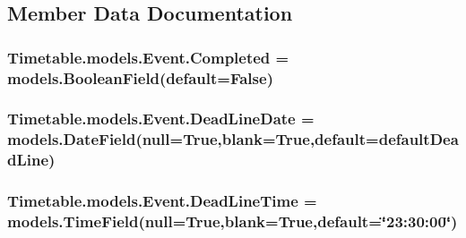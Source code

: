 \subsection{Member Data Documentation}
\subsubsection[{\texorpdfstring{Completed}{Completed}}]{\setlength{\rightskip}{0pt plus 5cm}Timetable.\+models.\+Event.\+Completed = models.\+Boolean\+Field(default=False)\hspace{0.3cm}{\ttfamily [static]}}\hypertarget{classTimetable_1_1models_1_1Event_a72b12a2e2015a620af6cfcf51a9231de}{}\label{classTimetable_1_1models_1_1Event_a72b12a2e2015a620af6cfcf51a9231de}
\subsubsection[{\texorpdfstring{Dead\+Line\+Date}{DeadLineDate}}]{\setlength{\rightskip}{0pt plus 5cm}Timetable.\+models.\+Event.\+Dead\+Line\+Date = models.\+Date\+Field(null=True,blank=True,default={\bf default\+Dead\+Line})\hspace{0.3cm}{\ttfamily [static]}}\hypertarget{classTimetable_1_1models_1_1Event_af6ab6e49e7feda614d433c6f224c337e}{}\label{classTimetable_1_1models_1_1Event_af6ab6e49e7feda614d433c6f224c337e}
\subsubsection[{\texorpdfstring{Dead\+Line\+Time}{DeadLineTime}}]{\setlength{\rightskip}{0pt plus 5cm}Timetable.\+models.\+Event.\+Dead\+Line\+Time = models.\+Time\+Field(null=True,blank=True,default=\char`\"{}23\+:30\+:00\char`\"{})\hspace{0.3cm}{\ttfamily [static]}}\hypertarget{classTimetable_1_1models_1_1Event_ac304261e5d4682f87b09c40c7ee9db03}{}\label{classTimetable_1_1models_1_1Event_ac304261e5d4682f87b09c40c7ee9db03}
